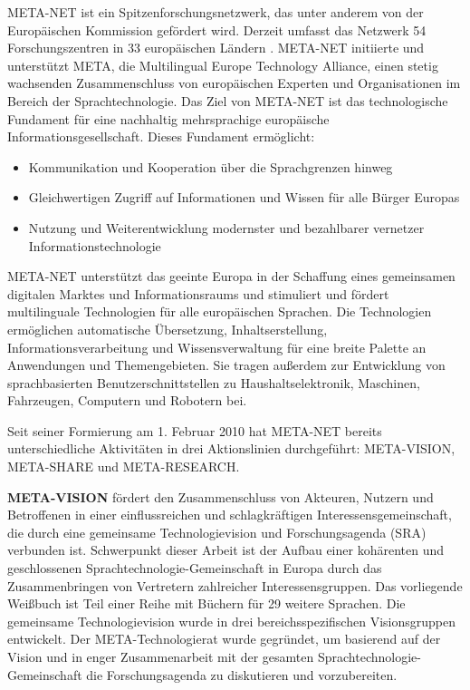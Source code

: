 \begin{multicols}{2}

META-NET ist ein Spitzenforschungsnetzwerk, das unter anderem von der Europäischen Kommission gefördert wird. Derzeit umfasst das Netzwerk 54 Forschungszentren in 33 europäischen Ländern \cite{rehm2011}. META-NET initiierte und unterstützt META, die Multilingual Europe Technology Alliance, 
einen stetig wachsenden Zusammenschluss von europäischen Experten und Organisationen im Bereich der Sprachtechnologie. Das Ziel von META-NET ist das technologische Fundament für eine nachhaltig mehrsprachige europäische Informationsgesellschaft. Dieses Fundament ermöglicht: 

\begin{itemize}
\item Kommunikation und Kooperation über die Sprachgrenzen hinweg
\item Gleichwertigen Zugriff auf Informationen und Wissen für alle Bürger Europas
\item Nutzung und Weiterentwicklung modernster und bezahlbarer vernetzer Informationstechnologie
\end{itemize}

META-NET unterstützt das geeinte Europa in der Schaffung eines gemeinsamen digitalen Marktes und Informationsraums und stimuliert und fördert multilinguale Technologien für alle europäischen Sprachen. Die Technologien ermöglichen automatische Übersetzung, Inhaltserstellung, Informationsverarbeitung und Wissensverwaltung für eine breite Palette an Anwendungen und Themengebieten. 
Sie tragen außerdem zur Entwicklung von sprachbasierten Benutzerschnittstellen zu Haushaltselektronik, Maschinen, Fahrzeugen, Computern und Robotern bei. 

Seit seiner Formierung am 1. Februar 2010 hat META-NET bereits unterschiedliche Aktivitäten in drei Aktionslinien durchgeführt: META-VISION, META-SHARE und META-RESEARCH. 

\textbf{META-VISION} fördert den Zusammenschluss von Akteuren, Nutzern und Betroffenen
in einer einflussreichen und schlagkräftigen Interessensgemeinschaft,
die durch eine gemeinsame Technologievision und Forschungsagenda (SRA) verbunden ist. Schwerpunkt dieser Arbeit ist der Aufbau einer kohärenten und geschlossenen Sprach\-tech\-no\-lo\-gie-Ge\-mein\-schaft in Europa durch das Zusammenbringen von Vertretern zahlreicher Interessensgruppen. Das vorliegende Weißbuch ist Teil einer Reihe mit Büchern für 29 weitere Sprachen.  
Die gemeinsame Technologievision wurde in drei bereichsspezifischen Visionsgruppen entwickelt.
Der META-Technologierat wurde gegründet, um basierend auf der Vision und in enger Zusammenarbeit mit der gesamten Sprachtechnologie-Gemeinschaft die Forschungsagenda zu diskutieren und vorzubereiten.


\end{multicols}
